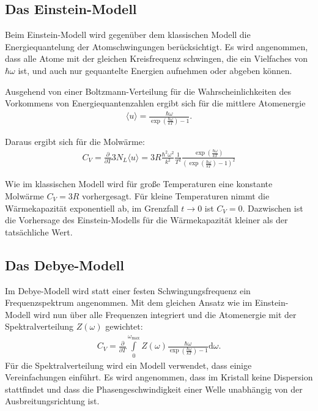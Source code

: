 \subsection{Das Einstein-Modell}
Beim Einstein-Modell wird gegenüber dem klassischen Modell die Energiequantelung der Atomschwingungen berücksichtigt.
Es wird angenommen, dass alle Atome mit der gleichen Kreisfrequenz schwingen, die ein Vielfaches von $\hbar\omega$ ist, und auch nur gequantelte Energien aufnehmen oder abgeben können.

Ausgehend von einer Boltzmann-Verteilung für die Wahrscheinlichkeiten des Vorkommens von Energiequantenzahlen ergibt sich für die mittlere Atomenergie
\begin{align}
	\langle u \rangle = \frac{\hbar \omega}{\exp \left( \frac{\hbar \omega}{kT} \right)-1}.
\end{align}

Daraus ergibt sich für die Molwärme:
\begin{align}
	C_V = \frac{\partial}{\partial T} 3N_L \langle u \rangle = 3R \frac{\hbar^2 \omega^2}{k^2}\frac{1}{T^2}\frac{\exp \left(\frac{\hbar\omega}{k T}\right)}{\left(\exp\left(\frac{\hbar\omega}{k T}\right) - 1\right)^2}
\end{align}

Wie im klassischen Modell wird für große Temperaturen eine konstante Molwärme $C_V = 3R$ vorhergesagt.
Für kleine Temperaturen nimmt die Wärmekapazität exponentiell ab, im Grenzfall $t \rightarrow 0$ ist $C_V = 0$.
Dazwischen ist die Vorhersage des Einstein-Modells für die Wärmekapazität kleiner als der tatsächliche Wert.

\subsection{Das Debye-Modell}

Im Debye-Modell wird statt einer festen Schwingungsfrequenz ein Frequenzspektrum angenommen.
Mit dem gleichen Ansatz wie im Einstein-Modell wird nun über alle Frequenzen integriert und die Atomenergie mit der Spektralverteilung $Z(\omega)$ gewichtet:
\begin{align}
	\label{debye1}
	C_V = \frac{\partial}{\partial T} \int\limits_{0}^{\omega_\mathrm{max}} Z(\omega) \frac{\hbar \omega}{\exp \left( \frac{\hbar \omega}{kT} \right)-1} \mathrm{d}\omega.
\end{align}
Für die Spektralverteilung wird ein Modell verwendet, dass einige Vereinfachungen einführt.
Es wird angenommen, dass im Kristall keine Dispersion stattfindet und dass die Phasengeschwindigkeit einer Welle unabhängig von der Ausbreitungsrichtung ist.

